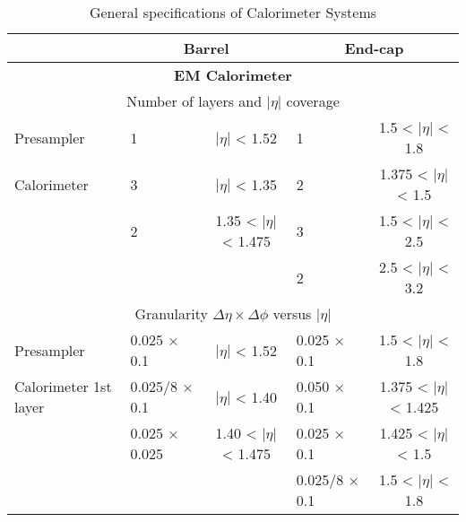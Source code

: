 \begin{table}[] \tiny \centering
\caption{General specifications of Calorimeter Systems \cite{atlas_tdr}}
\label{tab:cal_specs}
\begin{tabular}{|l|lc|lc|}
\hline 
                                               &                  \multicolumn{2}{c|}{\textbf{Barrel}}            &           \multicolumn{2}{c|}{\textbf{End-cap}}                                 \\
\hline 
                                               \multicolumn{5}{|c|}{\textbf{EM Calorimeter}} \\
\hline 
                                               \multicolumn{5}{|c|}{Number of layers and $|\eta|$ coverage} \\
\hline 
Presampler                                     & 1                 & $|\eta|$ < 1.52                 & 1                               & 1.5 < $|\eta|$ < 1.8     \\
Calorimeter                                    & 3                 & $|\eta|$ < 1.35                 & 2                               & 1.375 < $|\eta|$ < 1.5   \\
                                               & 2                 & 1.35 < $|\eta|$ < 1.475 & 3                                       & 1.5 < $|\eta|$ < 2.5     \\
                                               &                   &                                 & 2                            & 2.5 < $|\eta|$ < 3.2     \\
\hline 
                                               \multicolumn{5}{|c|}{Granularity $\Delta \eta \times \Delta \phi$ versus $|\eta|$} \\
\hline 
Presampler                                     & 0.025 × 0.1       & $|\eta|$ < 1.52                 & 0.025 × 0.1                     & 1.5 < $|\eta|$ < 1.8     \\
Calorimeter 1st layer                          & 0.025/8 × 0.1     & $|\eta|$ < 1.40                 & 0.050 × 0.1                     & 1.375 < $|\eta|$ < 1.425 \\
                                               & 0.025 × 0.025     & 1.40 < $|\eta|$ < 1.475 & 0.025 × 0.1                             & 1.425 < $|\eta|$ < 1.5   \\
                                               &                   &                                    & 0.025/8 × 0.1                   & 1.5 < $|\eta|$ < 1.8     \\

\end{tabular}
\end{table}
